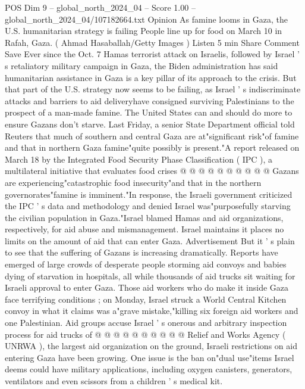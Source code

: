 \begin{textsample}{POS Dim 9 – global\_north\_2024\_04 – Score 1.00 – global\_north\_2024\_04/107182664.txt}  \label{ex:f9_pos_236}
Opinion As famine looms in Gaza, the U.S. humanitarian strategy is failing People line up for food on March 10 in Rafah, Gaza. ( Ahmad Hasaballah/Getty Images ) Listen 5 min Share Comment Save Ever since the Oct. 7 Hamas terrorist attack on Israelis, followed by Israel ' s retaliatory military campaign in Gaza, the Biden administration has said humanitarian assistance in Gaza is a key pillar of its approach to the crisis.
But that part of the U.S. strategy now seems to be failing, as Israel ' s indiscriminate attacks and barriers to aid deliveryhave consigned surviving Palestinians to the prospect of a man-made famine.
The United States can and should do more to ensure Gazans don't starve.
Last Friday, a senior State Department official told Reuters that much of southern and central Gaza are at"significant risk"of famine and that in northern Gaza famine"quite possibly is present."A report released on March 18 by the Integrated Food Security Phase Classification ( IPC ), a multilateral initiative that evaluates food crises @ @ @ @ @ @ @ @ @ @ Gazans are experiencing"catastrophic food insecurity"and that in the northern governorates"famine is imminent."In response, the Israeli government criticized the IPC ' s data and methodology and denied Israel was"purposefully starving the civilian population in Gaza."Israel blamed Hamas and aid organizations, respectively, for aid abuse and mismanagement.
Israel maintains it places no limits on the amount of aid that can enter Gaza.
Advertisement But it ' s plain to see that the suffering of Gazans is increasing dramatically.
Reports have emerged of large crowds of desperate people storming aid convoys and babies dying of starvation in hospitals, all while thousands of aid trucks sit waiting for Israeli approval to enter Gaza.
Those aid workers who do make it inside Gaza face terrifying conditions ; on Monday, Israel struck a World Central Kitchen convoy in what it claims was a"grave mistake,"killing six foreign aid workers and one Palestinian.
Aid groups accuse Israel ' s onerous and arbitrary inspection process for aid trucks of @ @ @ @ @ @ @ @ @ @ Relief and Works Agency ( UNRWA ), the largest aid organization on the ground, Israeli restrictions on aid entering Gaza have been growing.
One issue is the ban on"dual use"items Israel deems could have military applications, including oxygen canisters, generators, ventilators and even scissors from a children ' s medical kit.

\end{textsample}
